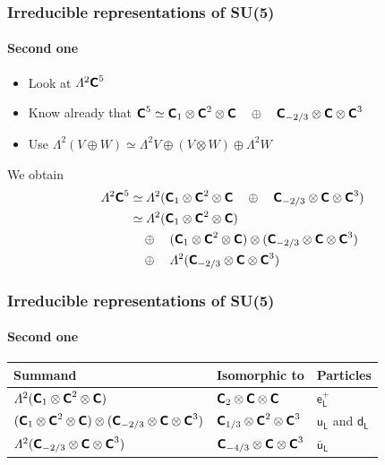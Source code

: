 \documentclass[english, fleqn]{beamer}
\begin{document}
\begin{frame}
    \frametitle{Irreducible representations of SU(5)}
    \framesubtitle{Second one}

    \begin{itemize}
        \item Look at $\Lambda^2 \C^5$
        \item Know already that $\C^5 \simeq \C_1 \otimes \C^2 \otimes \C \quad\oplus\quad \C_{-2/3} \otimes \C \otimes \C^3$
        \item Use $\Lambda^2(V \oplus W) \simeq \Lambda^2 V \oplus (V \otimes W) \oplus \Lambda^2 W$
    \end{itemize}

        We obtain
            \begin{align*}
                \Lambda^2 \C^5
                &\simeq
                \Lambda^2(\C_1 \otimes \C^2 \otimes \C \quad\oplus\quad \C_{-2/3} \otimes \C \otimes \C^3) \\
                &\simeq
                \Lambda^2(\C_1 \otimes \C^2 \otimes \C)
                \\&\quad\oplus\quad 
                (\C_1 \otimes \C^2 \otimes \C) \otimes (\C_{-2/3} \otimes \C \otimes \C^3)
                \\&\quad\oplus\quad 
                \Lambda^2(\C_{-2/3} \otimes \C \otimes \C^3)
            \end{align*}
\end{frame}

\begin{frame}
    \frametitle{Irreducible representations of SU(5)}
    \framesubtitle{Second one}

    \begin{tabular}{lll}
        \toprule
        Summand & Isomorphic to & Particles \\
        \midrule
        $\Lambda^2(\C_1 \otimes \C^2 \otimes \C)$ & $\C_2 \otimes \C \otimes \C$ & $\mathsf e^+_\mathsf L$ \\
        $(\C_1 \otimes \C^2 \otimes \C) \otimes (\C_{-2/3} \otimes \C \otimes \C^3)$ & $\C_{1/3} \otimes \C^2 \otimes \C^3$ & $\mathsf u_\mathsf L$ and $\mathsf d_\mathsf L$ \\
        $\Lambda^2(\C_{-2/3} \otimes \C \otimes \C^3)$ & $\C_{-4/3} \otimes \C \otimes \C^3$ & $\bar{\mathsf u}_\mathsf L$ \\
        \bottomrule
    \end{tabular}
\end{frame}
\end{document}
